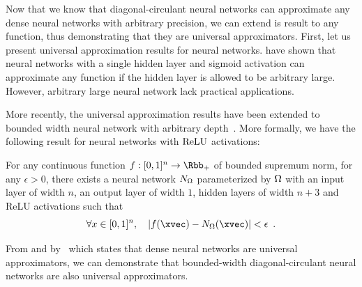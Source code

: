 


Now that we know that diagonal-circulant neural networks can approximate any dense neural networks with arbitrary precision, we can extend is result to any function, thus demonstrating that they are universal approximators.
First, let us present universal approximation results for neural networks.
\citet{cybenko1989approximation,hornik1989multilayer} have shown that neural networks with a single hidden layer and sigmoid activation can approximate any function if the hidden layer is allowed to be arbitrary large. 
However, arbitrary large neural network lack practical applications.

More recently, the universal approximation results have been extended to bounded width neural network with arbitrary depth~\cite{lu2017expressive,hanin2017universal}.
More formally, we have the following result for neural networks with $\mathrm{ReLU}$ activations:

\pagebreak

\begin{theorem}
  \label{theorem:ch3-universal_approximation_theorem_for_neural_network}
  For any continuous function $f:[0,1]^{n} \rightarrow \Rbb_+$ of bounded supremum norm, for any $\epsilon>0$, there exists a neural network $N_\Omega$ parameterized by $\Omega$ with an input layer of width $n$, an output layer of width $1$, hidden layers of width $n+3$ and ReLU activations such that 
  \begin{equation}
    \forall x \in [0,1]^n, \quad \left| f(\xvec) - \nn_\weights(\xvec) \right| < \epsilon \enspace.
  \end{equation}
  \removespace
\end{theorem}

From  and  by~\citet{hanin2017universal} which states that dense neural networks are universal approximators, we can demonstrate that bounded-width diagonal-circulant neural networks are also universal approximators.

